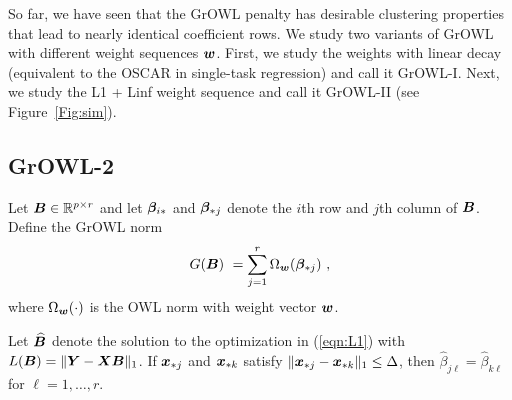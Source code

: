 So far, we have seen that the GrOWL penalty has desirable clustering properties that lead to nearly identical coefficient rows. We study two variants of GrOWL with different weight sequences $\boldsymbol{w}$. First, we study the weights with linear decay (equivalent to the OSCAR in single-task regression) and call it GrOWL-I. Next, we study the L1 + Linf weight sequence and call it GrOWL-II (see Figure~\ref{Fig:sim}). %


    




\iffalse
\subsection{GrOWL-2}

Let $\boldsymbol{B} \in {\mathbb R}^{p\times r}$ and let $\boldsymbol{\beta}_{i {\ast}}$ and $\boldsymbol{\beta}_{{\ast}  j}$ denote the $i$th row and $j$th column of $\boldsymbol{B}$.  Define the GrOWL norm
$$G(\boldsymbol{B}) \ = \sum_{j=1}^r \Omega_{\boldsymbol{w}}(\boldsymbol{\beta}_{{\ast} j}) \ , $$
where $\Omega_{\boldsymbol{w}}(\cdot)$ is the OWL norm with weight vector $\boldsymbol{w}$.  
\begin{theorem}
Let $\widehat {\boldsymbol{B}}$ denote the solution to the optimization in (\ref{eqn:L1}) with $L(\boldsymbol{B}) = \|\boldsymbol{Y} - \boldsymbol{X} \boldsymbol{B} \|_1$.
If $\boldsymbol{x}_{{\ast} j}$ and $\boldsymbol{x}_{{\ast} k}$ satisfy $\|\boldsymbol{x}_{{\ast} j}-\boldsymbol{x}_{{\ast} k}\|_1 \leq \Delta$, then
$\widehat \beta_{j \ell} = \widehat \beta_{k \ell}$ for $\ell = 1,\dots, r$.
\end{theorem}


